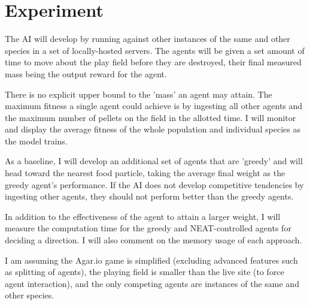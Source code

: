 \documentclass[11pt]{article}
\begin{document}
\section*{Experiment}

The AI will develop by running against other instances of the same and other species in a set of locally-hosted servers. The agents will be given a set amount of time to move about the play field before they are destroyed, their final measured mass being the output reward for the agent.

There is no explicit upper bound to the 'mass' an agent may attain. The maximum fitness a single agent could achieve is by ingesting all other agents and the maximum number of pellets on the field in the allotted time. I will monitor and display the average fitness of the whole population and individual species as the model trains.

As a baseline, I will develop an additional set of agents that are 'greedy' and will head toward the nearest food particle, taking the average final weight as the greedy agent's performance. If the AI does not develop competitive tendencies by ingesting other agents, they should not perform better than the greedy agents.

In addition to the effectiveness of the agent to attain a larger weight, I will measure the computation time for the greedy and NEAT-controlled agents for deciding a direction. I will also comment on the memory usage of each approach. 

I am assuming the Agar.io game is simplified (excluding advanced features such as splitting of agents), the playing field is smaller than the live site (to force agent interaction), and the only competing agents are instances of the same and other species.


% 

\end{document}
